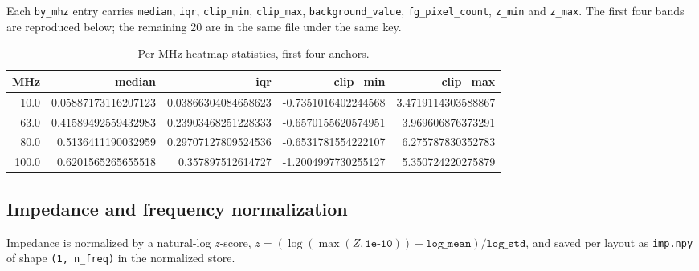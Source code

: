 Each \texttt{by\_mhz} entry carries \texttt{median}, \texttt{iqr}, \texttt{clip\_min},
\texttt{clip\_max}, \texttt{background\_value}, \texttt{fg\_pixel\_count}, \texttt{z\_min} and
\texttt{z\_max}. The first four bands are reproduced below; the remaining 20 are in the same file
under the same key.

\begin{table}[htbp]
\centering
\caption{Per-MHz heatmap statistics, first four anchors.}
\label{tab:appA_heatmap_by_mhz}
\begin{tabular}{r r r r r}
\hline
MHz & median & iqr & clip\_min & clip\_max \\
\hline
10.0 & 0.05887173116207123 & 0.03866304084658623 & -0.7351016402244568 & 3.4719114303588867 \\
63.0 & 0.41589492559432983 & 0.23903468251228333 & -0.6570155620574951 & 3.969606876373291 \\
80.0 & 0.5136411190032959 & 0.29707127809524536 & -0.6531781554222107 & 6.275787830352783 \\
100.0 & 0.6201565265655518 & 0.357897512614727 & -1.2004997730255127 & 5.350724220275879 \\
\hline
\end{tabular}
\end{table}


\subsection{Impedance and frequency normalization}
\label{subsec:appA_imp_norm}

Impedance is normalized by a natural-log $z$-score,
$z = (\log(\max(Z, \texttt{1e-10})) - \texttt{log\_mean})/\texttt{log\_std}$, and saved per layout
as \texttt{imp.npy} of shape \texttt{(1, n\_freq)} in the normalized store.

